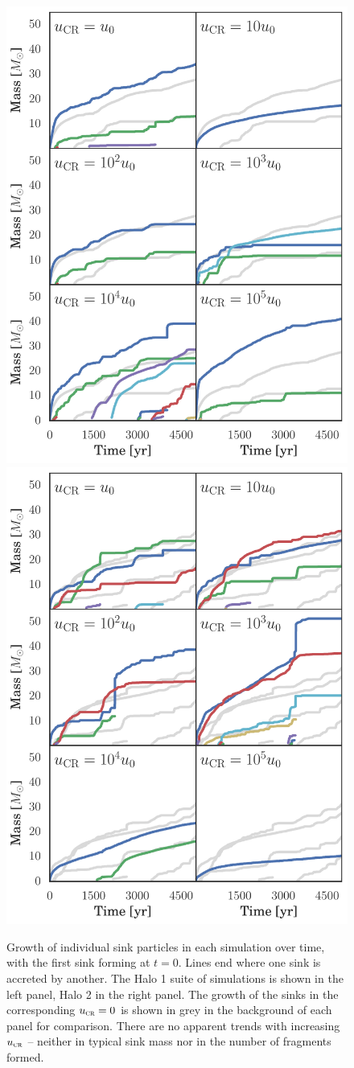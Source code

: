 \documentclass[../thesis.tex]{subfiles}
\begin{document}
\begin{figure}
\begin{center}
\includegraphics[width=.49\textwidth]{figures/sink_masses/sink_masses_halo1}
\includegraphics[width=.49\textwidth]{figures/sink_masses/sink_masses_halo2}
\caption{\label{fig:sinks} 
Growth of individual sink particles in each simulation over time, with the first sink forming at $t=0$. 
Lines end where one sink is accreted by another. 
The Halo 1 suite of simulations is shown in the left panel, Halo 2 in the right panel.  
The growth of the sinks in the corresponding ${u}_{\textsc{cr}}=0$ is shown in grey in the background of each panel for comparison. 
There are no apparent trends with increasing ${u}_{\textsc{cr}}$ -- neither in typical sink mass nor in the number of fragments formed.%
}
\end{center}
\end{figure}
\end{document}
